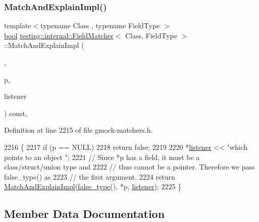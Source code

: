 \subsubsection{\texorpdfstring{Match\+And\+Explain\+Impl()}{MatchAndExplainImpl()}\hspace{0.1cm}{\footnotesize\ttfamily [2/2]}}
{\footnotesize\ttfamily template$<$typename Class , typename Field\+Type $>$ \\
\hyperlink{classbool}{bool} \hyperlink{classtesting_1_1internal_1_1FieldMatcher}{testing\+::internal\+::\+Field\+Matcher}$<$ Class, Field\+Type $>$\+::Match\+And\+Explain\+Impl (\begin{DoxyParamCaption}\item[{\hyperlink{namespacetesting_1_1internal_a62f917c3424d8841de9b49b5ec28edb4}{true\+\_\+type}}]{,  }\item[{const Class $\ast$}]{p,  }\item[{\hyperlink{classtesting_1_1MatchResultListener}{Match\+Result\+Listener} $\ast$}]{listener }\end{DoxyParamCaption}) const\hspace{0.3cm}{\ttfamily [inline]}, {\ttfamily [private]}}



Definition at line 2215 of file gmock-\/matchers.\+h.


\begin{DoxyCode}
2216                                                                 \{
2217     \textcolor{keywordflow}{if} (p == NULL)
2218       \textcolor{keywordflow}{return} \textcolor{keyword}{false};
2219 
2220     *\hyperlink{namespaceinteractive__marker_a0e579ab555212bb5e2c9f8a675b7618a}{listener} << \textcolor{stringliteral}{"which points to an object "};
2221     \textcolor{comment}{// Since *p has a field, it must be a class/struct/union type and}
2222     \textcolor{comment}{// thus cannot be a pointer.  Therefore we pass false\_type() as}
2223     \textcolor{comment}{// the first argument.}
2224     \textcolor{keywordflow}{return} \hyperlink{classtesting_1_1internal_1_1FieldMatcher_a3ac8072e68a33f78531d7b1eff96810c}{MatchAndExplainImpl}(\hyperlink{namespacetesting_1_1internal_abb1d0789f19bdde21affccbd1078b525}{false\_type}(), *p, 
      \hyperlink{namespaceinteractive__marker_a0e579ab555212bb5e2c9f8a675b7618a}{listener});
2225   \}
\end{DoxyCode}


\subsection{Member Data Documentation}
\mbox{\label{classtesting_1_1internal_1_1FieldMatcher_a5937d084f46df4f81948c33688408d31}} 

